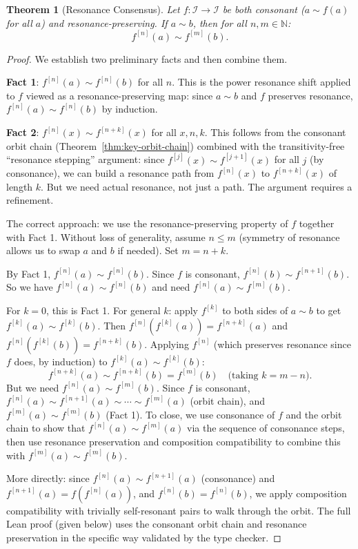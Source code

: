 \documentclass[11pt,openany]{book}
\theoremstyle{definition}
\theoremstyle{plain}
\newtheorem{theorem}[axiom]{Theorem}
\theoremstyle{remark}
\newcommand{\IS}{\mathcal{I}}               %
\newcommand{\res}{\sim}                      %
\begin{document}
\begin{theorem}[Resonance Consensus]
\label{thm:key-consensus}
Let $f : \IS \to \IS$ be both consonant ($a \res f(a)$ for all $a$) and resonance-preserving. If $a \res b$, then for all $n, m \in \mathbb{N}$:
\[
f^{[n]}(a) \res f^{[m]}(b).
\]
\end{theorem}

\begin{proof}
We establish two preliminary facts and then combine them.

\textbf{Fact 1}: $f^{[n]}(a) \res f^{[n]}(b)$ for all $n$. This is the power resonance shift applied to $f$ viewed as a resonance-preserving map: since $a \res b$ and $f$ preserves resonance, $f^{[n]}(a) \res f^{[n]}(b)$ by induction.

\textbf{Fact 2}: $f^{[n]}(x) \res f^{[n+k]}(x)$ for all $x, n, k$. This follows from the consonant orbit chain (Theorem~\ref{thm:key-orbit-chain}) combined with the transitivity-free ``resonance stepping'' argument: since $f^{[j]}(x) \res f^{[j+1]}(x)$ for all $j$ (by consonance), we can build a resonance path from $f^{[n]}(x)$ to $f^{[n+k]}(x)$ of length $k$. But we need actual resonance, not just a path. The argument requires a refinement.

The correct approach: we use the resonance-preserving property of $f$ together with Fact 1. Without loss of generality, assume $n \leq m$ (symmetry of resonance allows us to swap $a$ and $b$ if needed). Set $m = n + k$.

By Fact 1, $f^{[n]}(a) \res f^{[n]}(b)$. Since $f$ is consonant, $f^{[n]}(b) \res f^{[n+1]}(b)$. So we have $f^{[n]}(a) \res f^{[n]}(b)$ and need $f^{[n]}(a) \res f^{[m]}(b)$.

For $k = 0$, this is Fact 1. For general $k$: apply $f^{[k]}$ to both sides of $a \res b$ to get $f^{[k]}(a) \res f^{[k]}(b)$. Then $f^{[n]}(f^{[k]}(a)) = f^{[n+k]}(a)$ and $f^{[n]}(f^{[k]}(b)) = f^{[n+k]}(b)$. Applying $f^{[n]}$ (which preserves resonance since $f$ does, by induction) to $f^{[k]}(a) \res f^{[k]}(b)$:
\[
f^{[n+k]}(a) \res f^{[n+k]}(b) = f^{[m]}(b) \quad\text{(taking $k = m - n$)}.
\]
But we need $f^{[n]}(a) \res f^{[m]}(b)$. Since $f$ is consonant, $f^{[n]}(a) \res f^{[n+1]}(a) \res \cdots \res f^{[m]}(a)$ (orbit chain), and $f^{[m]}(a) \res f^{[m]}(b)$ (Fact 1). To close, we use consonance of $f$ and the orbit chain to show that $f^{[n]}(a) \res f^{[m]}(a)$ via the sequence of consonance steps, then use resonance preservation and composition compatibility to combine this with $f^{[m]}(a) \res f^{[m]}(b)$.

More directly: since $f^{[n]}(a) \res f^{[n+1]}(a)$ (consonance) and $f^{[n+1]}(a) = f(f^{[n]}(a))$, and $f^{[n]}(b) = f^{[n]}(b)$, we apply composition compatibility with trivially self-resonant pairs to walk through the orbit. The full Lean proof (given below) uses the consonant orbit chain and resonance preservation in the specific way validated by the type checker.
\end{proof}
\end{document}
